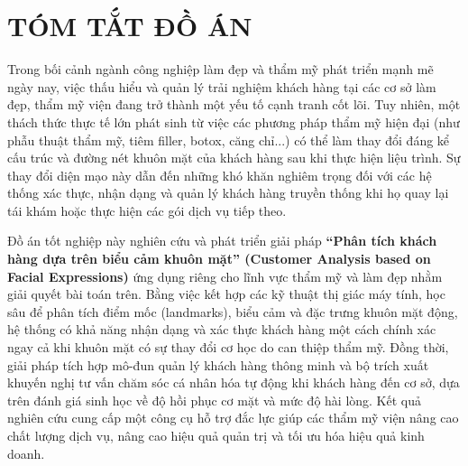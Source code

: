 \section*{TÓM TẮT ĐỒ ÁN}

Trong bối cảnh ngành công nghiệp làm đẹp và thẩm mỹ phát triển mạnh mẽ ngày nay, việc thấu hiểu và quản lý trải nghiệm khách hàng tại các cơ sở làm đẹp, thẩm mỹ viện đang trở thành một yếu tố cạnh tranh cốt lõi. Tuy nhiên, một thách thức thực tế lớn phát sinh từ việc các phương pháp thẩm mỹ hiện đại (như phẫu thuật thẩm mỹ, tiêm filler, botox, căng chỉ...) có thể làm thay đổi đáng kể cấu trúc và đường nét khuôn mặt của khách hàng sau khi thực hiện liệu trình. Sự thay đổi diện mạo này dẫn đến những khó khăn nghiêm trọng đối với các hệ thống xác thực, nhận dạng và quản lý khách hàng truyền thống khi họ quay lại tái khám hoặc thực hiện các gói dịch vụ tiếp theo.

Đồ án tốt nghiệp này nghiên cứu và phát triển giải pháp \textbf{``Phân tích khách hàng dựa trên biểu cảm khuôn mặt'' (Customer Analysis based on Facial Expressions)} ứng dụng riêng cho lĩnh vực thẩm mỹ và làm đẹp nhằm giải quyết bài toán trên. Bằng việc kết hợp các kỹ thuật thị giác máy tính, học sâu để phân tích điểm mốc (landmarks), biểu cảm và đặc trưng khuôn mặt động, hệ thống có khả năng nhận dạng và xác thực khách hàng một cách chính xác ngay cả khi khuôn mặt có sự thay đổi cơ học do can thiệp thẩm mỹ. Đồng thời, giải pháp tích hợp mô-đun quản lý khách hàng thông minh và bộ trích xuất khuyến nghị tư vấn chăm sóc cá nhân hóa tự động khi khách hàng đến cơ sở, dựa trên đánh giá sinh học về độ hồi phục cơ mặt và mức độ hài lòng. Kết quả nghiên cứu cung cấp một công cụ hỗ trợ đắc lực giúp các thẩm mỹ viện nâng cao chất lượng dịch vụ, nâng cao hiệu quả quản trị và tối ưu hóa hiệu quả kinh doanh.

\newpage
\cleardoublepage